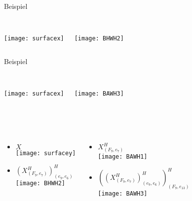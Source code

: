 \documentclass{beamer}
\begin{document}
\begin{frame}{Beispiel}
\begin{columns}
   \\
    \texttt{[image: surfacex]}
 
    \\
    \texttt{[image: BHWH2]}
\end{columns}
\end{frame}
\begin{frame}{Beispiel}
\begin{columns}
   \\
    \texttt{[image: surfacex]}
 
    \\
    \texttt{[image: BAWH3]}
\end{columns}
\end{frame}
\begin{frame}
\\
\begin{columns}
\begin{itemize}
\item $X$\\
\texttt{[image: surfacey]}
\item $(X^H_{(F_9,e_7)})^H_{(e_9,e_{6})}$\\
\texttt{[image: BHWH2]}
\end{itemize}
\begin{itemize}
\item $X^H_{(F_9,e_7)}$\\
\texttt{[image: BAWH1]}
\item $((X^H_{(F_9,e_7)})^H_{(e_9,e_{6})})^H_{(F_9,e_{13})}$\\
\texttt{[image: BAWH3]}
\end{itemize}
\end{columns}
\end{frame}
\end{document}
